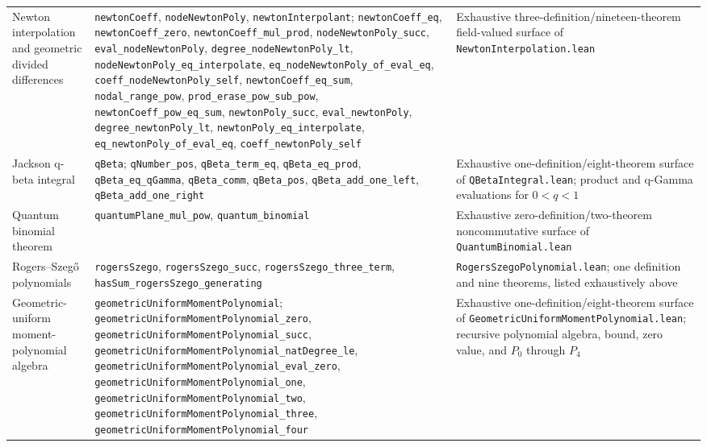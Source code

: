 \documentclass[11pt,oneside]{article}
\theoremstyle{definition}
\theoremstyle{remark}
\begin{document}
\begin{longtable}{@{}>{\raggedright\arraybackslash}p{} >{\raggedright\arraybackslash}p{} >{\raggedright\arraybackslash}p{}@{}}
Newton interpolation and geometric divided differences & \nolinkurl{newtonCoeff}, \nolinkurl{nodeNewtonPoly}, \nolinkurl{newtonInterpolant}; \nolinkurl{newtonCoeff_eq}, \nolinkurl{newtonCoeff_zero}, \nolinkurl{newtonCoeff_mul_prod}, \nolinkurl{nodeNewtonPoly_succ}, \nolinkurl{eval_nodeNewtonPoly}, \nolinkurl{degree_nodeNewtonPoly_lt}, \nolinkurl{nodeNewtonPoly_eq_interpolate}, \nolinkurl{eq_nodeNewtonPoly_of_eval_eq}, \nolinkurl{coeff_nodeNewtonPoly_self}, \nolinkurl{newtonCoeff_eq_sum}, \nolinkurl{nodal_range_pow}, \nolinkurl{prod_erase_pow_sub_pow}, \nolinkurl{newtonCoeff_pow_eq_sum}, \nolinkurl{newtonPoly_succ}, \nolinkurl{eval_newtonPoly}, \nolinkurl{degree_newtonPoly_lt}, \nolinkurl{newtonPoly_eq_interpolate}, \nolinkurl{eq_newtonPoly_of_eval_eq}, \nolinkurl{coeff_newtonPoly_self} & Exhaustive three-definition/nineteen-theorem field-valued surface of \nolinkurl{NewtonInterpolation.lean} \\
Jackson q-beta integral & \nolinkurl{qBeta}; \nolinkurl{qNumber_pos}, \nolinkurl{qBeta_term_eq}, \nolinkurl{qBeta_eq_prod}, \nolinkurl{qBeta_eq_qGamma}, \nolinkurl{qBeta_comm}, \nolinkurl{qBeta_pos}, \nolinkurl{qBeta_add_one_left}, \nolinkurl{qBeta_add_one_right} & Exhaustive one-definition/eight-theorem surface of \nolinkurl{QBetaIntegral.lean}; product and q-Gamma evaluations for \(0<q<1\) \\
Quantum binomial theorem & \nolinkurl{quantumPlane_mul_pow}, \nolinkurl{quantum_binomial} & Exhaustive zero-definition/two-theorem noncommutative surface of \nolinkurl{QuantumBinomial.lean} \\
Rogers--Szeg\H{o} polynomials & \nolinkurl{rogersSzego}, \nolinkurl{rogersSzego_succ}, \nolinkurl{rogersSzego_three_term}, \nolinkurl{hasSum_rogersSzego_generating} & \nolinkurl{RogersSzegoPolynomial.lean}; one definition and nine theorems, listed exhaustively above \\
Geometric-uniform moment-polynomial algebra & \nolinkurl{geometricUniformMomentPolynomial}; \nolinkurl{geometricUniformMomentPolynomial_zero}, \nolinkurl{geometricUniformMomentPolynomial_succ}, \nolinkurl{geometricUniformMomentPolynomial_natDegree_le}, \nolinkurl{geometricUniformMomentPolynomial_eval_zero}, \nolinkurl{geometricUniformMomentPolynomial_one}, \nolinkurl{geometricUniformMomentPolynomial_two}, \nolinkurl{geometricUniformMomentPolynomial_three}, \nolinkurl{geometricUniformMomentPolynomial_four} & Exhaustive one-definition/eight-theorem surface of \nolinkurl{GeometricUniformMomentPolynomial.lean}; recursive polynomial algebra, bound, zero value, and \(P_0\) through \(P_4\) \\

\end{longtable}
\end{document}
